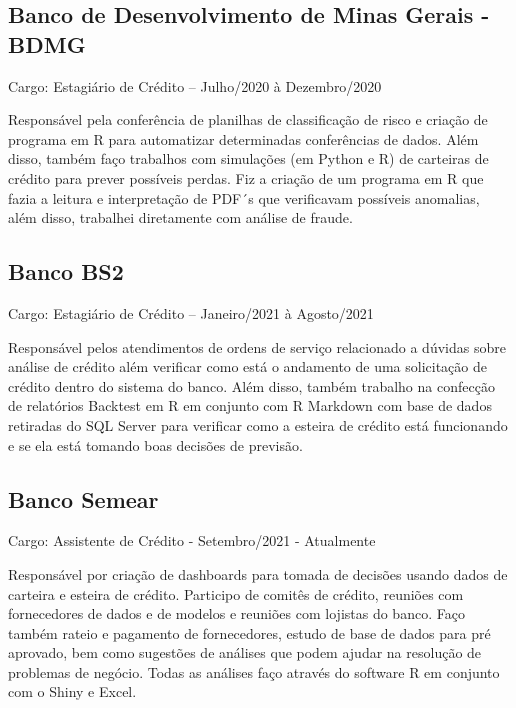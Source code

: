 \documentclass[
]{book}
\begin{document}
\hypertarget{banco-de-desenvolvimento-de-minas-gerais---bdmg}{%
\subsection{Banco de Desenvolvimento de Minas Gerais - BDMG}\label{banco-de-desenvolvimento-de-minas-gerais---bdmg}}

Cargo: Estagiário de Crédito -- Julho/2020 à Dezembro/2020

Responsável pela conferência de planilhas de classificação de risco e criação de programa em R para automatizar determinadas conferências de dados. Além disso, também faço trabalhos com simulações (em Python e R) de carteiras de crédito para prever possíveis perdas. Fiz a criação de um programa em R que fazia a leitura e interpretação de PDF´s que verificavam possíveis anomalias, além disso, trabalhei diretamente com análise de fraude.

\hypertarget{banco-bs2}{%
\subsection{Banco BS2}\label{banco-bs2}}

Cargo: Estagiário de Crédito -- Janeiro/2021 à Agosto/2021

Responsável pelos atendimentos de ordens de serviço relacionado a dúvidas sobre análise de crédito além verificar como está o andamento de uma solicitação de crédito dentro do sistema do banco. Além disso, também trabalho na confecção de relatórios Backtest em R em conjunto com R Markdown com base de dados retiradas do SQL Server para verificar como a esteira de crédito está funcionando e se ela está tomando boas decisões de previsão.

\hypertarget{banco-semear}{%
\subsection{Banco Semear}\label{banco-semear}}

Cargo: Assistente de Crédito - Setembro/2021 - Atualmente

Responsável por criação de dashboards para tomada de decisões usando dados de carteira e esteira de crédito. Participo de comitês de crédito, reuniões com fornecedores de dados e de modelos e reuniões com lojistas do banco.
Faço também rateio e pagamento de fornecedores, estudo de base de dados para pré aprovado, bem como sugestões de análises que podem ajudar na resolução de problemas de negócio.
Todas as análises faço através do software R em conjunto com o Shiny e Excel.
\end{document}
